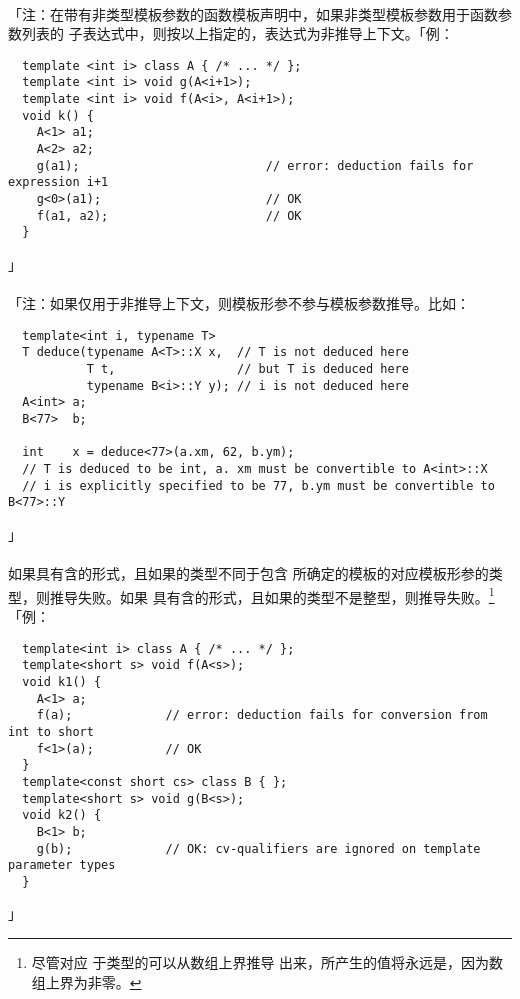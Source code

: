\paragraph{}
「注：在带有非类型模板参数的函数模板声明中，如果非类型模板参数用于函数参数列表的
子表达式中，则按以上指定的，表达式为非推导上下文。「例：
\begin{lstlisting}
  template <int i> class A { /* ... */ };
  template <int i> void g(A<i+1>);
  template <int i> void f(A<i>, A<i+1>);
  void k() {
    A<1> a1;
    A<2> a2;
    g(a1);                          // error: deduction fails for expression i+1
    g<0>(a1);                       // OK
    f(a1, a2);                      // OK
  }
\end{lstlisting}」

\paragraph{}
「注：如果仅用于非推导上下文，则模板形参不参与模板参数推导。比如：
\begin{lstlisting}
  template<int i, typename T>
  T deduce(typename A<T>::X x,  // T is not deduced here
           T t,                 // but T is deduced here
           typename B<i>::Y y); // i is not deduced here
  A<int> a;
  B<77>  b;

  int    x = deduce<77>(a.xm, 62, b.ym);
  // T is deduced to be int, a. xm must be convertible to A<int>::X
  // i is explicitly specified to be 77, b.ym must be convertible to B<77>::Y
\end{lstlisting}」

\paragraph{}
如果具有含的形式，且如果的类型不同于包含
所确定的模板的对应模板形参的类型，则推导失败。如果
具有含\tm{[i]}的形式，且如果的类型不是整型，则推导失败。\footnote{尽管对应
于类型的可以从数组上界推导
出来，所产生的值将永远是，因为数组上界为非零。}「例：
\begin{lstlisting}
  template<int i> class A { /* ... */ };
  template<short s> void f(A<s>);
  void k1() {
    A<1> a;
    f(a);             // error: deduction fails for conversion from int to short
    f<1>(a);          // OK
  }
  template<const short cs> class B { };
  template<short s> void g(B<s>);
  void k2() {
    B<1> b;
    g(b);             // OK: cv-qualifiers are ignored on template parameter types
  }
\end{lstlisting}」

